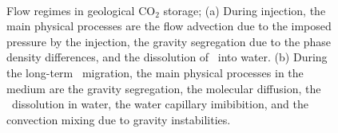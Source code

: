 \begin{figure}[tbp!]%
  \hspace{0.0cm}
  \center
  \\
  \caption{Flow regimes in geological $\mbox{CO}_2$ storage; (a) During injection, the main physical processes are the flow advection due to the imposed pressure by the injection, the gravity segregation due to the phase density differences, and the dissolution of \coo\ into water. (b) During the long-term \coo\ migration, the main physical processes in the medium are the gravity segregation, the molecular diffusion, the \coo\ dissolution in water, the water capillary imibibition, and the convection mixing due to gravity instabilities.}
 \label{fig:Frc}
\end{figure}



